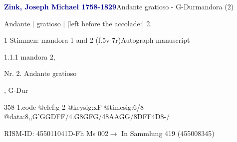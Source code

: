 \documentclass[twocolumn, 12pt]{book}
\begin{document}
\par \vspace{16pt} \textcolor{darkblue}{\textbf{Zink, Joseph Michael  1758-1829}}\hfillplus{\textbf{[358]}}\newline Andante gratioso - G-Dur\newline mandora (2)
\par \begin{itshape} Andante | gratioso | [left before the accolade:] 2.\end{itshape} 
\par \textcolor{darkblue}{}  1 Stimmen: mandora 1 and 2  (f.5v-7r)\newline Autograph manuscript
\par 1.1.1  mandora 2, \begin{itshape}Nr. 2. Andante gratioso\end{itshape}, G-Dur  
\begin{filecontents*}{358-1.code}
@clef:g-2
@keysig:xF
@timesig:6/8
@data:8,,G'GGDFF/4.G8GFG/48AAGG/8DFF4D8-/
\end{filecontents*}
\newline %
\par RISM-ID: 455011041\newline D-Fh  Ms 002\newline $\rightarrow$ In Sammlung 419 (455008345)
      
\end{document}
